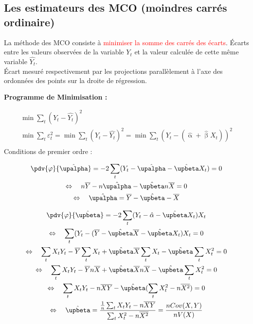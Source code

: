 \documentclass{article}
\begin{document}
\subsection{Les estimateurs des MCO (moindres carrés ordinaire)}
La méthode des MCO consiste à \textcolor{red}{minimiser la somme des carrés des écarts}. Écarts entre les valeurs observées de la variable \(Y_t\) et la valeur calculée de cette même variable \(\hat{Y_t}\). \\ 
Écart mesuré respectivement par les projections parallèlement à l'axe des ordonnées des points sur la droite de régression. \\
\begin{center}
	\textbf{Programme de Minimisation :}
\end{center}
\begin{gather*}
	\min \sum_t (Y_t - \hat{Y_t})^2 \\
	\min \sum_t \varepsilon^2_t = \min \sum_t ( Y_t - \hat{Y_t})^2 = \min \sum_t (Y_t - (\hat{\upalpha} + \hat{\upbeta} X_t))^2 \\ 
\end{gather*}
Conditions de premier ordre :
\begin{multicols}{2}
\begin{gather*}
	\pdv{\varphi}{\hat{\upalpha}} = -2 \sum_t (Y_t - \hat{\upalpha} - \hat{\upbeta} X_t ) = 0 \\
	\Leftrightarrow \quad n \overline{Y} - n \hat{\upalpha} - \hat{\upbeta} n \overline{X} = 0 \\
	\Leftrightarrow \quad \hat{\upalpha} = \overline{Y} - \hat{\upbeta} - \overline{X}
\end{gather*}
\columnbreak

\begin{gather*}
	\pdv{\varphi}{\hat{\upbeta}} = -2 \sum_t (Y_t - \hat{\alpha} - \hat{\upbeta} X_t) X_t \\
	\Leftrightarrow \quad \sum_t (Y_t - (\overline{Y} - \hat{\upbeta} \overline{X} - \hat{\upbeta} X_t) X_t = 0 \\
	\Leftrightarrow \quad \sum_t X_tY_t - \overline{Y} \sum_t X_t + \hat{\upbeta} \overline{X} \sum_t X_t - \hat{\upbeta} \sum_t X_t^2 = 0\\
	\Leftrightarrow \quad \sum_t X_tY_t - \overline{Y} n \overline{X} + \hat{\upbeta} \overline{X} n \overline{X} - \hat{\upbeta} \sum_t X_t^2 = 0 \\
	\Leftrightarrow \quad \sum_t X_tY_t - n \overline{X} \overline{Y} - \hat{\upbeta} (\sum_t X_t^2 -n \overline{X^2}) = 0 \\
	\Leftrightarrow \quad \hat{\upbeta} = \frac{\frac{1}{n}\sum_t X_tY_t - n \overline{X} \overline{Y}}{\sum_t X_t^2 -n \overline{X^2}} = \frac{n Cov(X,Y)}{n V(X)}
\end{gather*}
\end{multicols}
\end{document}
